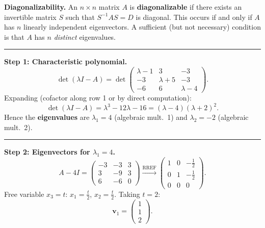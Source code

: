 \documentclass[12pt,a3paper]{article}
\begin{document}
\begin{tcolorbox}[enhanced,breakable,
colback=cE!4,colframe=cE,boxrule=0.8pt,arc=5pt,
title={\textbf{Answer --- Diagonalization of $A=\begin{pmatrix}1&-3&3\\3&-5&3\\6&-6&4\end{pmatrix}$; Computing $A^{13}$}},
fonttitle=\bfseries\color{white},colbacktitle=cE]
\textbf{Diagonalizability.} An $n\times n$ matrix $A$ is \textbf{diagonalizable} if there
exists an invertible matrix $S$ such that $S^{-1}AS = D$ is diagonal.
This occurs if and only if $A$ has $n$ linearly independent eigenvectors.
A sufficient (but not necessary) condition is that $A$ has $n$ \emph{distinct}
eigenvalues.

\medskip\textcolor{cE}{\rule{\textwidth}{0.4pt}}
\textbf{Step 1: Characteristic polynomial.}
$$ \det(\lambda I - A) = \det\begin{pmatrix}\lambda-1&3&-3\\-3&\lambda+5&-3\\-6&6&\lambda-4\end{pmatrix}.$$
Expanding (cofactor along row 1 or by direct computation):
$$ \det(\lambda I - A) = \lambda^3 - 12\lambda - 16 = (\lambda - 4)(\lambda+2)^2.$$
Hence the \textbf{eigenvalues} are $\lambda_1 = 4$ (algebraic mult.\ 1) and
$\lambda_2 = -2$ (algebraic mult.\ 2).

\medskip\textcolor{cE}{\rule{\textwidth}{0.4pt}}
\textbf{Step 2: Eigenvectors for $\lambda_1 = 4$.}
$$ A - 4I = \begin{pmatrix}-3&-3&3\\3&-9&3\\6&-6&0\end{pmatrix} \xrightarrow{\text{RREF}} \begin{pmatrix}1&0&-\tfrac{1}{2}\\0&1&-\tfrac{1}{2}\\0&0&0\end{pmatrix}.$$
Free variable $x_3 = t$: $x_1 = \tfrac{t}{2}$, $x_2 = \tfrac{t}{2}$.
Taking $t=2$:
$$ \mathbf{v}_1 = \begin{pmatrix}1\\1\\2\end{pmatrix}.$$


\end{tcolorbox}
\end{document}
